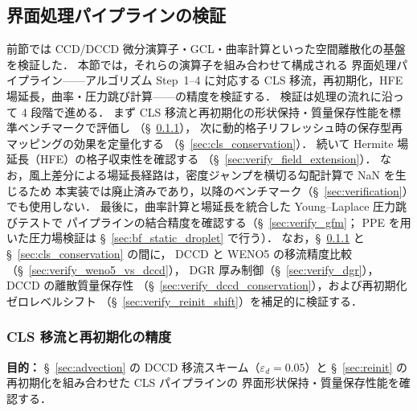 %

\subsection{界面処理パイプラインの検証}
\label{sec:verify_interface}

前節では CCD/DCCD 微分演算子・GCL・曲率計算といった空間離散化の基盤を検証した．
本節では，それらの演算子を組み合わせて構成される
界面処理パイプライン——アルゴリズム Step~1--4 に対応する
CLS 移流，再初期化，HFE 場延長，曲率・圧力跳び計算——の精度を検証する．
検証は処理の流れに沿って 4 段階で進める．
まず CLS 移流と再初期化の形状保持・質量保存性能を標準ベンチマークで評価し
（§~\ref{sec:verify_cls_advection}），
次に動的格子リフレッシュ時の保存型再マッピングの効果を定量化する
（§~\ref{sec:cls_conservation}）．
続いて Hermite 場延長（HFE）の格子収束性を確認する
（§~\ref{sec:verify_field_extension}）．
なお，風上差分による場延長経路は，密度ジャンプを横切る勾配計算で NaN を生じるため
本実装では廃止済みであり，以降のベンチマーク（§~\ref{sec:verification}）でも使用しない．
最後に，曲率計算と場延長を統合した Young--Laplace 圧力跳びテストで
パイプラインの結合精度を確認する（§~\ref{sec:verify_gfm}；
PPE を用いた圧力場検証は §~\ref{sec:bf_static_droplet} で行う）．
なお，§~\ref{sec:verify_cls_advection} と §~\ref{sec:cls_conservation} の間に，
DCCD と WENO5 の移流精度比較（§~\ref{sec:verify_weno5_vs_dccd}），
DGR 厚み制御（§~\ref{sec:verify_dgr}），DCCD の離散質量保存性
（§~\ref{sec:verify_dccd_conservation}），および再初期化ゼロレベルシフト
（§~\ref{sec:verify_reinit_shift}）を補足的に検証する．


\subsubsection{CLS 移流と再初期化の精度}
\label{sec:verify_cls_advection}

\noindent\textbf{目的：}
§~\ref{sec:advection} の DCCD 移流スキーム（$\varepsilon_d = 0.05$）と
§~\ref{sec:reinit} の再初期化を組み合わせた CLS パイプラインの
界面形状保持・質量保存性能を確認する．

